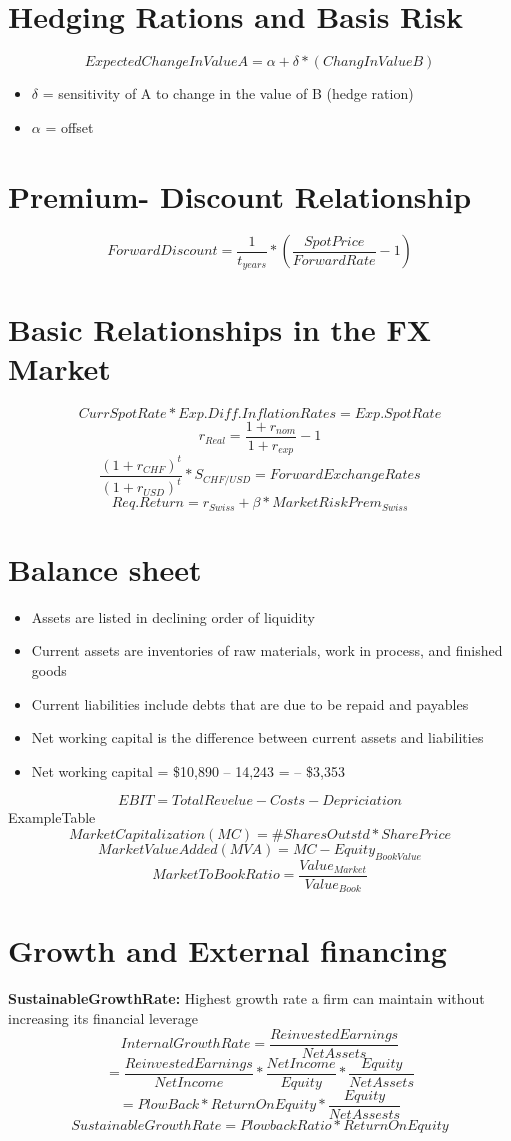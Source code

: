 \documentclass{cheatsheet}
\begin{document}
\section*{Hedging Rations and Basis Risk}
\[ExpectedChangeInValueA = \alpha + \delta * (ChangInValueB)\]
\begin{itemize}
  \item $\delta$ = sensitivity of A to change in the value of B (hedge ration)
  \item $\alpha$ = offset
\end{itemize}
\section*{Premium- Discount Relationship}
\[ForwardDiscount = \frac{1}{t_{years}} * (\frac{SpotPrice}{ForwardRate} - 1)\]
\section*{Basic Relationships
in the FX Market}
\vspace{30mm}
\[CurrSpotRate * Exp.Diff.InflationRates = Exp.SpotRate\]
\[r_{Real} = \frac{1+r_{nom}}{1+r_{exp}}-1\]
\[\frac{(1+r_{CHF})^t}{(1+r_{USD})^t}*S_{CHF/USD} = ForwardExchangeRates\]
\[Req.Return = r_{Swiss} + \beta * MarketRiskPrem_{Swiss}\]
\section*{Balance sheet}
\begin{itemize}
  \item Assets are listed in declining order of liquidity
  \item Current assets are inventories of raw materials, work in process, and finished goods
  \item Current liabilities include debts that are due to be repaid and payables
  \item Net working capital is the difference between current assets and liabilities
  \item Net working capital = \$10,890 -- 14,243 = -- \$3,353
\end{itemize}

\[EBIT = TotalRevelue - Costs - Depriciation\]
\vspace{30mm}
ExampleTable
\[MarketCapitalization(MC) = \#SharesOutstd * SharePrice\]
\[MarketValueAdded(MVA) = MC - Equity_{BookValue}\]
\[MarketToBookRatio = \frac{Value_{Market}}{Value_{Book}}\]

\section{Growth and External financing}
\textbf{SustainableGrowthRate:} Highest growth rate a firm can maintain without
increasing its financial leverage
\[InternalGrowthRate = \frac{ReinvestedEarnings}{NetAssets}\]
\[= \frac{ReinvestedEarnings}{NetIncome}*\frac{NetIncome}{Equity}*\frac{Equity}{NetAssets}\]
\[= PlowBack * ReturnOnEquity * \frac{Equity}{NetAssests}\]
\[SustainableGrowthRate = PlowbackRatio * ReturnOnEquity\]
\end{document}
